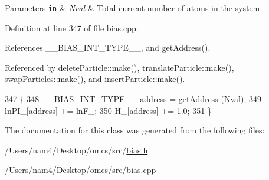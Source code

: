 \begin{DoxyParams}[1]{Parameters}
\mbox{\tt in}  & {\em Nval} & Total current number of atoms in the system \\
\hline
\end{DoxyParams}


Definition at line 347 of file bias.\+cpp.



References \+\_\+\+\_\+\+B\+I\+A\+S\+\_\+\+I\+N\+T\+\_\+\+T\+Y\+P\+E\+\_\+\+\_\+, and get\+Address().



Referenced by delete\+Particle\+::make(), translate\+Particle\+::make(), swap\+Particles\+::make(), and insert\+Particle\+::make().


\begin{DoxyCode}
347                                  \{
348                 \hyperlink{bias_8h_a1ceb524363fcb94da0c64d297ea27438}{\_\_BIAS\_INT\_TYPE\_\_} address = \hyperlink{classwala_a01a9bf2af8eaf65c719745ad1b12d238}{getAddress} (Nval);
349                 lnPI\_[address] += lnF\_;
350                 H\_[address] += 1.0;
351 \}
\end{DoxyCode}


The documentation for this class was generated from the following files\+:\begin{DoxyCompactItemize}
\item 
/\+Users/nam4/\+Desktop/omcs/src/\hyperlink{bias_8h}{bias.\+h}\item 
/\+Users/nam4/\+Desktop/omcs/src/\hyperlink{bias_8cpp}{bias.\+cpp}\end{DoxyCompactItemize}
